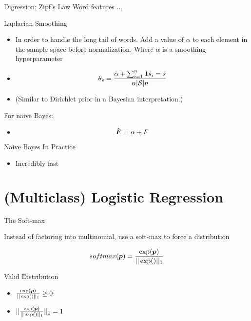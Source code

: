 \documentclass{beamer}
\begin{document}
\begin{frame}{Digression: Zipf's Law}
  Word features ... 
\end{frame}

\begin{frame}{Laplacian Smoothing}
  \begin{itemize}
  \item   In order to handle the long tail of words. 
    Add a value of $\alpha$ to each element in the sample space before normalization.
    Where $\alpha$ is a smoothing hyperparameter 
  \item 
    \[ \theta_s =  \frac{\alpha + \sum_{i=1}^n \boldsymbol{1}{s_i = s}}{\alpha|\mathcal{S}| n} \]
    
  \item (Similar to Dirichlet prior in a Bayesian interpretation.) 
  \end{itemize}

  For naive Bayes:
  \begin{itemize}
  \item \[\hat{\boldsymbol{F}} = \alpha + F\]
  \end{itemize}
\end{frame}

  
  


\begin{frame}{Naive Bayes In Practice}
  
  \begin{itemize}
  \item Incredibly fast
  \end{itemize}
\end{frame}

\section{(Multiclass) Logistic Regression}

\begin{frame}{The Soft-max}

  Instead of factoring into multinomial, use a soft-max to force a distribution
  
  \[softmax(\boldsymbol{p}) = \frac{\exp(\boldsymbol{p})}{||\exp(\bold)||_1}  \]

  Valid Distribution 

  \begin{itemize}
  \item $\frac{\exp(\boldsymbol{p})}{||\exp(\bold)||_1} \geq 0$ 
  \item $||\frac{\exp(\boldsymbol{p})}{||\exp(\bold)||_1}||_1 = 1$ 
  \end{itemize}


\end{frame}
\end{document}
